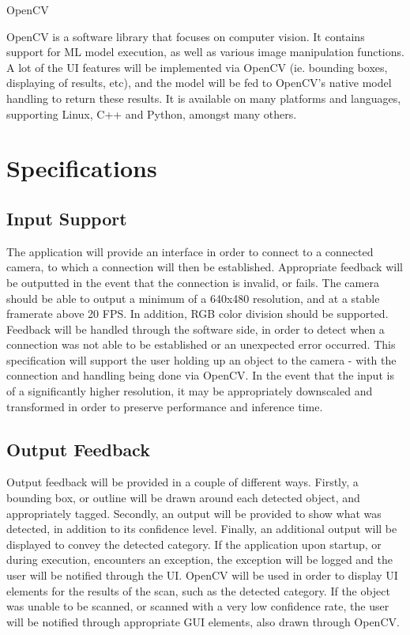 \documentclass[conference]{IEEEtran}
\begin{document}
\begin{center}
OpenCV
\end{center}
OpenCV is a software library that focuses on computer vision. It contains support for ML model execution, as well as various image manipulation functions. 
\newline
A lot of the UI features will be implemented via OpenCV (ie. bounding boxes, displaying of results, etc), and the model will be fed to OpenCV's native model handling to return these results. It is available on many platforms and languages, supporting Linux, C++ and Python, amongst many others.

\section{Specifications}
\subsection{Input Support}
The application will provide an interface in order to connect to a connected camera, to which a connection will then be established. Appropriate feedback will be outputted in the event that the connection is invalid, or fails.
\newline
The camera should be able to output a minimum of a 640x480 resolution, and at a stable framerate above 20 FPS. In addition, RGB color division should be supported. Feedback will be handled through the software side, in order to detect when a connection was not able to be established or an unexpected error occurred.
\newline
This specification will support the user holding up an object to the camera - with the connection and handling being done via OpenCV. In the event that the input is of a significantly higher resolution, it may be appropriately downscaled and transformed in order to preserve performance and inference time. 

\subsection{Output Feedback}
Output feedback will be provided in a couple of different ways. Firstly, a bounding box, or outline will be drawn around each detected object, and appropriately tagged. Secondly, an output will be provided to show what was detected, in addition to its confidence level. Finally, an additional output will be displayed to convey the detected category.
\newline
If the application upon startup, or during execution, encounters an exception, the exception will be logged and the user will be notified through the UI. OpenCV will be used in order to display UI elements for the results of the scan, such as the detected category.
If the object was unable to be scanned, or scanned with a very low confidence rate, the user will be notified through appropriate GUI elements, also drawn through OpenCV.
\end{document}
